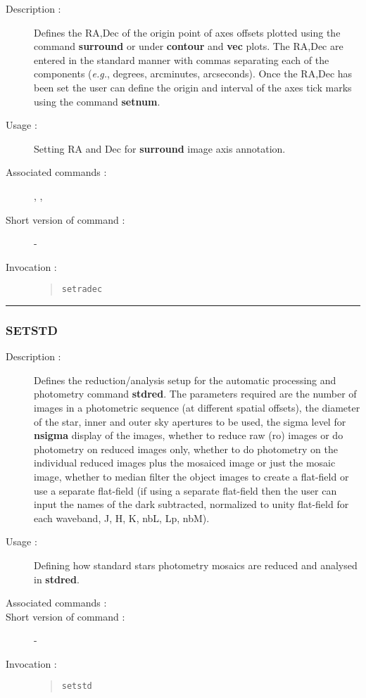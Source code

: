 \begin{description}

\item[Description :] Defines the RA,Dec of the origin point of axes
offsets plotted using the command {\bf surround} or under {\bf contour}
and {\bf vec} plots.  The RA,Dec are entered in the standard manner
with commas separating each of the components (\emph{e.g.}, degrees,
arcminutes, arcseconds).  Once the RA,Dec has been set the user can
define the origin and interval of the axes tick marks using the command
{\bf setnum}.

\item[Usage :] Setting RA and Dec for {\bf surround} image axis annotation.

\item[Associated commands :] {\tt {}},
{\tt {}}, {\tt {}}

\item[Short version of command :] -
\item[Invocation :]

\begin{quote}{\tt  setradec }\end{quote}

\end{description}

\hrule
\subsubsection*{\label{SETSTD}SETSTD}

\begin{description}

\item[Description :] Defines the reduction/analysis setup for the
automatic processing and photometry command {\bf stdred}.  The
parameters required are the number of images in a photometric sequence
(at different spatial offsets), the diameter of the star, inner and
outer sky apertures to be used, the sigma level for {\bf nsigma}
display of the images, whether to reduce raw ({\sc ro}) images or do
photometry on reduced images only, whether to do photometry on the
individual reduced images plus the mosaiced image or just the mosaic
image, whether to median filter the object images to create a
flat-field or use a separate flat-field (if using a separate flat-field
then the user can input the names of the dark subtracted, normalized to
unity flat-field for each waveband, J, H, K, nbL, Lp, nbM).

\item[Usage :] Defining how standard stars photometry mosaics are
reduced and analysed in {\bf stdred}.

\item[Associated commands :] {\tt {}}
\item[Short version of command :] -
\item[Invocation :]

\begin{quote}{\tt  setstd }\end{quote}

\end{description}

